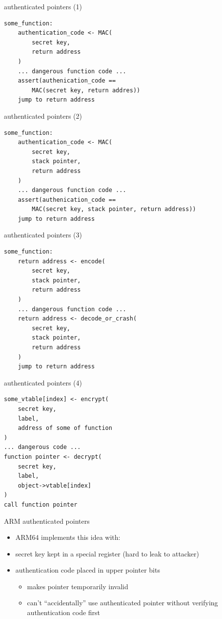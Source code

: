 \begin{frame}[fragile,label=authPtr1]{authenticated pointers (1)}
\begin{lstlisting}[language={},style=smaller]
some_function:
    authentication_code <- MAC(
        secret key, 
        return address
    )
    ... dangerous function code ...
    assert(authenication_code ==
        MAC(secret key, return addres))
    jump to return address
\end{lstlisting}
\end{frame}

\begin{frame}[fragile,label=authPtr2]{authenticated pointers (2)}
\begin{lstlisting}[language={},style=smaller]
some_function:
    authentication_code <- MAC(
        secret key,
        stack pointer, 
        return address
    )
    ... dangerous function code ...
    assert(authenication_code ==
        MAC(secret key, stack pointer, return address))
    jump to return address
\end{lstlisting}
\end{frame}


\begin{frame}[fragile,label=authPtr3]{authenticated pointers (3)}
\begin{lstlisting}[language={},style=smaller]
some_function:
    return address <- encode(
        secret key,
        stack pointer, 
        return address
    )
    ... dangerous function code ...
    return address <- decode_or_crash(
        secret key,
        stack pointer, 
        return address
    )
    jump to return address
\end{lstlisting}
\end{frame}

\begin{frame}[fragile,label=authPtr4]{authenticated pointers (4)}
\begin{lstlisting}[language={},style=smaller]
some_vtable[index] <- encrypt(
    secret key,
    label,
    address of some of function
)
... dangerous code ...
function pointer <- decrypt(
    secret key,
    label,
    object->vtable[index]
)
call function pointer
\end{lstlisting}
\end{frame}

\begin{frame}{ARM authenticated pointers}
    \begin{itemize}
    \item ARM64 implements this idea with:
    \vspace{.5cm}
    \item secret key kept in a special register (hard to leak to attacker)
    \item authentication code placed in upper pointer bits
        \begin{itemize}
        \item makes pointer temporarily invalid
        \item can't ``accidentally'' use authenticated pointer without verifying authentication code first
        \end{itemize}
    \end{itemize}
\end{frame}


